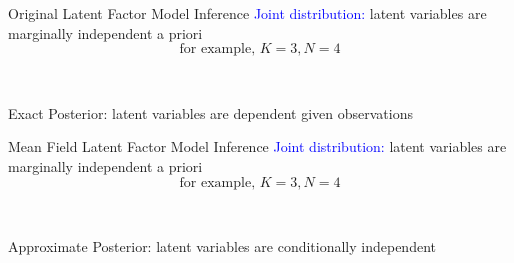 \documentclass[14pt, aspectratio=169]{beamer}
\begin{document}
\begin{frame}{Original Latent Factor Model Inference}
\textcolor{blue}{Joint distribution:} latent variables are marginally independent a priori\\
$$\text{for example, }K=3, N=4$$
\begin{figure}
\center
{}
\end{figure}

~

\alert{Exact Posterior: } latent variables are dependent given observations

\end{frame}

\begin{frame}{Mean Field Latent Factor Model Inference}
\textcolor{blue}{Joint distribution:} latent variables are marginally independent a priori\\
$$\text{for example, }K=3, N=4$$
\begin{figure}
\center
{}
\end{figure}

~

\alert{Approximate Posterior: } latent variables are conditionally independent

\end{frame}
\end{document}
